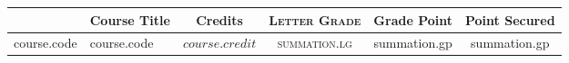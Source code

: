 \documentclass[11pt]{article}
\newcommand*{\numtwo}[1]{\pgfmathprintnumber[
                    fixed, precision=2, fixed zerofill=true]{#1}}
\begin{document}
            \begin{center}
                \renewcommand{\arraystretch}{1.08}
                
            \begin{tabular}{|c|l|c|>{\scshape}c|c|c|}
            \hline  \rule[-1ex]{0pt}{3.5ex} {\centering{\bf Course Code}} &  \multicolumn{1}{c|}{\textbf{Course Title}}  & {\bf Credits} & {\bf Letter Grade} & {\bf Grade Point} & {\bf Point Secured}  \\ 
            
            \hline   course.code &  course.code			 & $course.credit$ & summation.lg & summation.gp & summation.gp \\ %
            \end{tabular}
            \end{center}
            \renewcommand{\arraystretch}{1.03}
\end{document}
